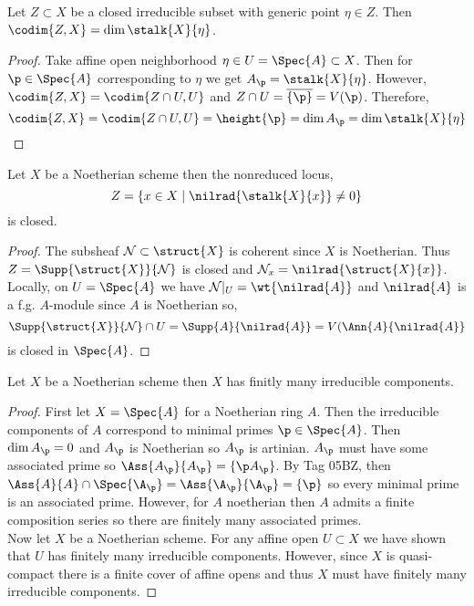 \documentclass[12pt]{article}
\begin{document}
\begin{lemma} \label{codimension_loc_rings}
Let $Z \subset X$ be a closed irreducible subset with generic point $\eta \in Z$. Then $\codim{Z,X} = \dim{\stalk{X}{\eta}}$. 
\end{lemma}


\begin{proof}
Take affine open neighborhood $\eta \in U = \Spec{A} \subset X$. Then for $\p \in \Spec{A}$ corresponding to $\eta$ we get $A_\p = \stalk{X}{\eta}$. However, $\codim{Z, X} = \codim{Z \cap U, U}$ and $Z \cap U = \overline{\{ \p \}} = V(\p)$. Therefore,
\[ \codim{Z, X} = \codim{Z \cap U, U} = \height{\p} = \dim{A_\p} = \dim{\stalk{X}{\eta}} \]
\end{proof}

\begin{lemma}
Let $X$ be a Noetherian scheme then the nonreduced locus,
\[ Z = \{ x \in X \mid \nilrad{\stalk{X}{x}} \neq 0 \} \]
is closed.
\end{lemma} 

\begin{proof}
The subsheaf $\Nil \subset \struct{X}$ is coherent since $X$ is Noetherian. Thus $Z = \Supp{\struct{X}}{\Nil}$ is closed and $\Nil_x = \nilrad{\struct{X}{x}}$. Locally, on $U = \Spec{A}$ we have $\Nil |_U  = \wt{\nilrad{A}}$ and $\nilrad{A}$ is a f.g. $A$-module since $A$ is Noetherian so,
\[ \Supp{\struct{X}}{\Nil} \cap U = \Supp{A}{\nilrad{A}} = V(\Ann{A}{\nilrad{A}} \]
is closed in $\Spec{A}$. 
\end{proof}

\begin{lemma}
Let $X$ be a Noetherian scheme then $X$ has finitly many irreducible components.
\end{lemma}

\begin{proof}
First let $X = \Spec{A}$ for a Noetherian ring $A$. Then the irreducible components of $A$ correspond to minimal primes $\p \in \Spec{A}$. Then $\dim{A_\p} = 0$ and $A_\p$ is Noetherian so $A_\p$ is artinian. $A_\p$ must have some associated prime so $\Ass{A_\p}{A_\p} = \{ \p A_\p \}$.  By Tag 05BZ, then $\Ass{A}{A} \cap \Spec{\A_\p} = \Ass{\A_\p}{\A_\p} = \{ \p \}$ so every minimal prime is an associated prime. However, for $A$ noetherian then $A$ admits a finite composition series so there are finitely many associated primes.
\bigskip\\
Now let $X$ be a Noetherian scheme. For any affine open $U \subset X$ we have shown that $U$ has finitely many irreducible components. However, since $X$ is quasi-compact there is a finite cover of affine opens and thus $X$ must have finitely many irreducible components. 
\end{proof}
\end{document}
